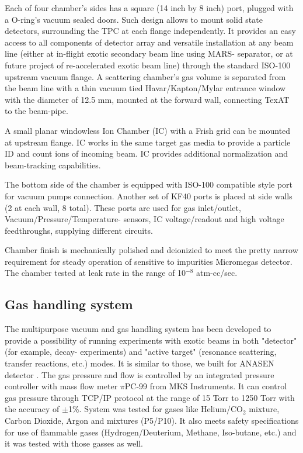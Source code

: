 \documentclass[final,number,sort&compress,5p,times,twocolumn]{elsarticle}
\begin{document}
Each of four chamber's sides has a square (14 inch by 8 inch) port, plugged with a O-ring's vacuum sealed doors. Such design allows to mount solid state detectors, surrounding the TPC at each flange independently. It provides  an easy access to  all components of detector array and  versatile installation at any beam line (either at in-flight exotic secondary beam line using MARS- separator,  or at future project of re-accelerated exotic beam line) through the standard ISO-100 upstream vacuum flange.  	A scattering chamber's gas volume is separated from the beam line with a thin vacuum tied Havar/Kapton/Mylar entrance window with the diameter of 12.5 mm,  mounted at the forward wall, connecting  TexAT to the beam-pipe.
	
A small  planar windowless Ion Chamber (IC) with a Frish grid can be mounted at upstream flange. IC works in  the same target gas media to provide a particle ID and count ions of incoming beam. IC  provides additional normalization and beam-tracking capabilities.
	
The bottom side of the chamber is equipped with ISO-100 compatible style port for vacuum pumps connection. 
Another set of KF40 ports is placed at side walls (2 at each wall, 8 total). These ports are used for gas inlet/outlet, Vacuum/Pressure/Temperature-  sensors,  IC voltage/readout  and high voltage feedthroughs, supplying different circuits. 

Chamber finish is mechanically polished and deionizied to meet the pretty narrow requirement for  steady operation of  sensitive to impurities Micromegas  detector. The chamber tested at leak rate in the range of 10$^{-8}$ atm-cc/sec.

\subsection{Gas handling system}
	
The multipurpose vacuum and gas handling system
has been developed to provide a possibility of running experiments with
exotic beams in both "detector" (for example, decay- experiments)  and "active target" (resonance scattering,
transfer reactions, etc.) modes. It is similar to those, we built for ANASEN detector \cite{}.
The gas pressure and flow is controlled by  an integrated pressure
controller with mass flow meter $\pi$PC-99 from MKS Instruments.
It can control gas  pressure through
TCP/IP protocol at the range of 15 Torr to 1250 Torr  with the accuracy of $\pm$1\%.
System was tested for gases like Helium/CO$_2$ mixture, Carbon Dioxide, Argon and mixtures (P5/P10).
It also meets  safety specifications for use of flammable gases (Hydrogen/Deuterium, Methane,
Iso-butane, etc.) and it was tested with those gasses as well.
\end{document}
